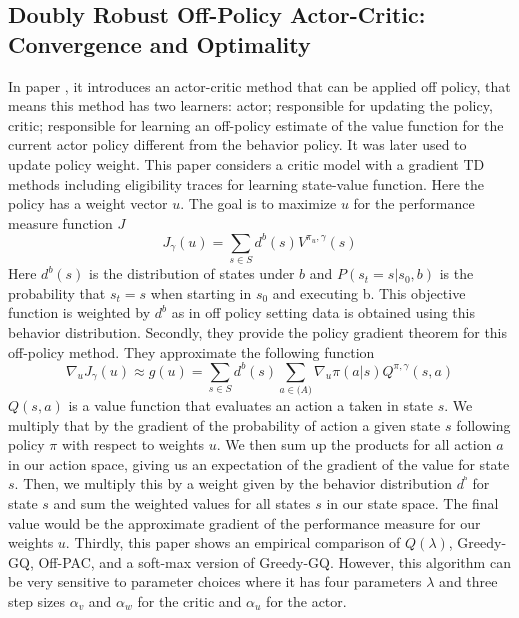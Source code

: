 \subsection{Doubly Robust Off-Policy Actor-Critic: Convergence and Optimality \cite{xu2021doubly}}
In paper \cite{degris2012off}, it introduces an actor-critic method that can be applied off policy, that means this method has two learners: actor; responsible for updating the policy, critic; responsible for learning an off-policy estimate of the value function for the current actor policy different from the behavior policy. It was later used to update policy weight. This paper considers a critic model with a gradient TD methods including eligibility traces for learning state-value function. Here the policy has a weight vector $u$. The goal is to maximize $u$ for the performance measure function $J$
\begin{equation}
    J_{\gamma}(u)=\sum_{s\in S} d^b(s)V^{\pi_u,\gamma}(s)
\end{equation}
Here $d^b(s)$ is the distribution of states under $b$ and $P(s_t=s|s_0,b)$ is the probability  that $s_t=s$ when starting in $s_0$ and executing b. This objective function is weighted by $d^b$ as in off policy setting data is obtained using this behavior distribution. Secondly, they provide the policy gradient theorem for this off-policy method. They approximate the following function 
\begin{equation}
    \nabla_u J_{\gamma}(u) \approx g(u)=\sum_{s\in S}d^b(s) \sum_{a \in \mathcal(A)} \nabla_u \pi(a|s)Q^{\pi,\gamma}(s,a)
\end{equation}
 $Q(s, a)$ is a value function that evaluates an action a taken in state $s$. We multiply that by the gradient of the probability of action a given state $s$ following policy $\pi$ with respect to weights $u$. We then sum up the products for all action $a$ in our action space, giving us an expectation of the gradient of the value for state $s$. Then, we multiply this by a weight given by the behavior distribution $d^ᵇ$ for state $s$ and sum the weighted values for all states $s$ in our state space. The final value would be the approximate gradient of the performance measure for our weights $u$. Thirdly, this paper shows an empirical comparison of $Q(\lambda)$, Greedy-GQ, Off-PAC, and a soft-max version of Greedy-GQ. However, this algorithm can be very sensitive to parameter choices  where it has four parameters $\lambda$ and three step sizes $\alpha_v$ and $\alpha_w$ for the critic and $\alpha_u$ for the actor. 
 
